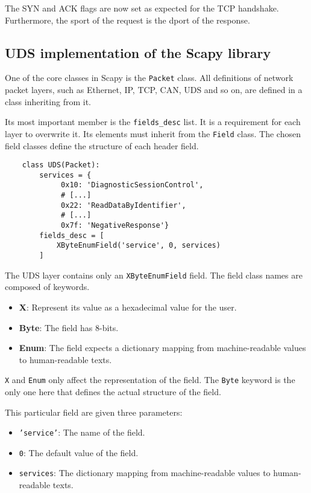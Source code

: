 The SYN and ACK flags are now set as expected for the TCP handshake. Furthermore, the sport of the request is the dport of the response.

\subsection{UDS implementation of the Scapy library}

One of the core classes in Scapy is the \texttt{Packet} class. All definitions of network packet layers, such as Ethernet, IP, TCP, CAN, UDS and so on, are defined in a class inheriting from it.

Its most important member is the \texttt{fields_desc} list. It is a requirement for each layer to overwrite it. Its elements must inherit from the \texttt{Field} class. The chosen field classes define the structure of each header field.

\begin{samepage}
    \begin{verbatim}
    class UDS(Packet):
        services = {
             0x10: 'DiagnosticSessionControl',
             # [...]
             0x22: 'ReadDataByIdentifier',
             # [...]
             0x7f: 'NegativeResponse'}
        fields_desc = [
            XByteEnumField('service', 0, services)
        ]
    \end{verbatim}
\end{samepage}

The UDS layer contains only an \texttt{XByteEnumField} field. The field class names are composed of keywords.
\begin{itemize}
    \item \textbf{X}: Represent its value as a hexadecimal value for the user.
    \item \textbf{Byte}: The field has 8-bits.
    \item \textbf{Enum}: The field expects a dictionary mapping from machine-readable values to human-readable texts.
\end{itemize}

\texttt{X} and \texttt{Enum} only affect the representation of the field. The \texttt{Byte} keyword is the only one here that defines the actual structure of the field.

This particular field are given three parameters:

\begin{itemize}
    \item \texttt{'service'}: The name of the field.
    \item \texttt{0}: The default value of the field.
    \item \texttt{services}: The dictionary mapping from machine-readable values to human-readable texts.
\end{itemize}

